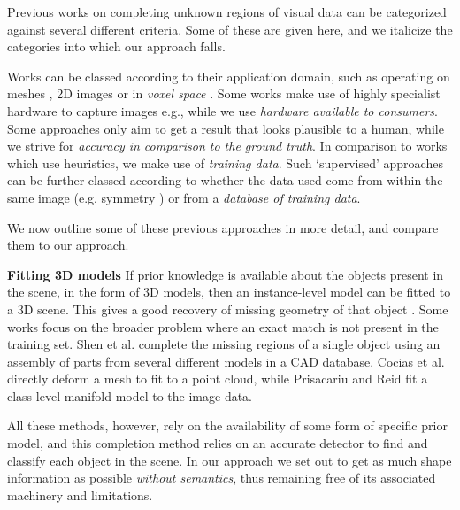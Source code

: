 \documentclass[10pt,twocolumn,letterpaper]{article}
\makeatletter
\renewcommand*{\eg}{e.g.\@\xspace}
\newcommand*{\ea}{et al.\@\xspace}
\makeatother
\begin{document}


Previous works on completing unknown regions of visual data can be categorized against several different criteria.
Some of these are given here, and we italicize the categories into which our approach falls.

Works can be classed according to their application domain, such as operating on meshes \cite{harary-tog-2013, schnabel-eurographics-2009}, 2D images \cite{gupta-cvpr-2011} or in \emph{voxel space} \cite{kim-iccv-2013}.
Some works make use of highly specialist hardware to capture images \eg \cite{velten-nature-2012}, while we use \emph{hardware available to consumers}.
Some approaches only aim to get a result that looks plausible to a human, while we strive for \emph{accuracy in comparison to the ground truth}.
In comparison to works which use heuristics, we make use of \emph{training data}.
Such `supervised' approaches can be further classed according to whether the data used come from within the same image (\eg symmetry \cite{kroemer-humanoids-2012}) or from a \emph{database of training data}.

We now outline some of these previous approaches in more detail, and compare them to our approach.


\noindent\textbf{Fitting 3D models}
If prior knowledge is available about the objects present in the scene, in the form of 3D models, then an instance-level model can be fitted to a 3D scene.
This gives a good recovery of missing geometry of that object \cite{hinterstoisser-accv-2012, drost-3dimpvt-2012}.
Some works focus on the broader problem where an exact match is not present in the training set.
Shen \ea \cite{shen-tog-2012} complete the missing regions of a single object using an assembly of parts from several different models in a CAD database.
Cocias \ea \cite{cocias-cgvcv-2013} directly deform a mesh to fit to a point cloud, while Prisacariu and Reid \cite{prisacariu-iccv-2011} fit a class-level manifold model to the image data.

All these methods, however, rely on the availability of some form of specific prior model, and this completion method relies on an accurate detector to find and classify each object in the scene.
In our approach we set out to get as much shape information as possible \emph{without semantics}, thus remaining free of its associated machinery and limitations.
\end{document}
